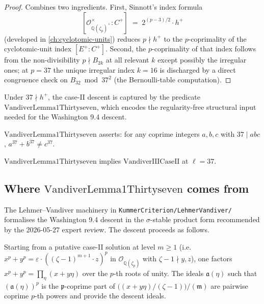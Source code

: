 \begin{proof}\leanok
  Combines two ingredients.  First, Sinnott's index formula
  \[
    [\mathcal O_{\mathbb Q(\zeta_p)^+}^\times : C^+] \;=\; 2^{(p-3)/2} \cdot h^+
  \]
  (developed in \cref{ch:cyclotomic-units}) reduces $p \nmid h^+$ to the
  $p$-coprimality of the cyclotomic-unit index $[E^+ : C^+]$.  Second, the
  $p$-coprimality of that index follows from the non-divisibility
  $p \nmid B_{2k}$ at all relevant $k$ except possibly the irregular ones;
  at $p = 37$ the unique irregular index $k = 16$ is discharged by a
  direct congruence check on $B_{32}\bmod 37^2$ (the Bernoulli-table
  computation).
\end{proof}

Under $37 \nmid h^+$, the case-II descent is captured by the predicate
$\mathrm{VandiverLemma1Thirtyseven}$, which encodes the
regularity-free structural input needed for the Washington 9.4 descent.

\begin{definition}
  \label{def:vandiverLemma1Thirtyseven}
  \leanok
  $\mathrm{VandiverLemma1Thirtyseven}$ asserts: for any coprime
  integers $a,b,c$ with $37 \mid abc$, $a^{37} + b^{37} \neq c^{37}$.
\end{definition}

\begin{theorem}
  \label{thm:caseII_thirtyseven_of_vandiverLemma1}
  \leanok
  $\mathrm{VandiverLemma1Thirtyseven}$ implies $\mathrm{VandiverIIICaseII}$
  at $\ell = 37$.
\end{theorem}

\subsection*{Where $\mathrm{VandiverLemma1Thirtyseven}$ comes from}

The Lehmer--Vandiver machinery in
\texttt{KummerCriterion/LehmerVandiver/} formalises the
Washington 9.4 descent in the $\sigma$-stable product form recommended
by the 2026-05-27 expert review.  The descent proceeds as follows.

Starting from a putative case-II solution at level $m \ge 1$
(i.e.\ $x^p + y^p = \varepsilon \cdot ((\zeta-1)^{m+1} \cdot z)^p$ in
$\mathcal O_{\mathbb Q(\zeta_p)}$ with $\zeta - 1 \nmid y, z$), one
factors $x^p + y^p = \prod_\eta (x + y\eta)$ over the $p$-th roots of
unity.  The ideals $\mathfrak a(\eta)$ such that
$(\mathfrak a(\eta))^p$ is the $\mathfrak p$-coprime part of
$\bigl((x + y\eta)/(\zeta-1)\bigr)/(\mathfrak m)$ are pairwise coprime
$p$-th powers and provide the descent ideals.

